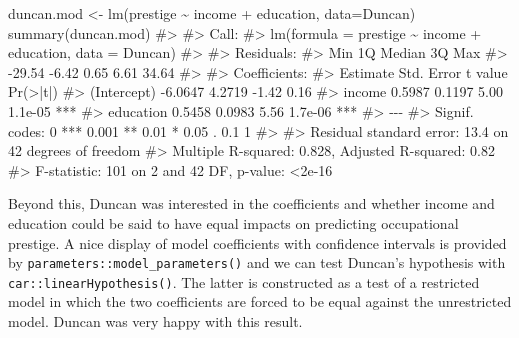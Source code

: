 \documentclass[
  letterpaper,
  10pt,
  krantz2]{krantz}
\makeatletter
\newenvironment{Shaded}{\begin{snugshade}}{\end{snugshade}}
\newcommand{\AttributeTok}[1]{\textcolor[rgb]{0.40,0.45,0.13}{#1}}
\newcommand{\CommentTok}[1]{\textcolor[rgb]{0.37,0.37,0.37}{#1}}
\newcommand{\FunctionTok}[1]{\textcolor[rgb]{0.28,0.35,0.67}{#1}}
\newcommand{\NormalTok}[1]{\textcolor[rgb]{0.00,0.23,0.31}{#1}}
\newcommand{\OtherTok}[1]{\textcolor[rgb]{0.00,0.23,0.31}{#1}}
\newcommand{\SpecialCharTok}[1]{\textcolor[rgb]{0.37,0.37,0.37}{#1}}
\newenvironment{kframe}{%
  \medskip{}
  \setlength{\fboxsep}{.8em}
  \def\at@end@of@kframe{}%
  \ifinner\ifhmode%
  \def\at@end@of@kframe{\end{minipage}}%
  \begin{minipage}{\columnwidth}%
  \fi\fi%
  \def\FrameCommand##1{\hskip\@totalleftmargin \hskip-\fboxsep
  \colorbox{shadecolor}{##1}\hskip-\fboxsep
      \hskip-\linewidth \hskip-\@totalleftmargin \hskip\columnwidth}%
  \MakeFramed {\advance\hsize-\width
    \@totalleftmargin\z@ \linewidth\hsize
    \@setminipage}}%
{\par\unskip\endMakeFramed%
  \at@end@of@kframe}
\renewenvironment{Shaded}{\begin{kframe}}{\end{kframe}}
\makeatother
\begin{document}
\begin{Shaded}
\begin{Highlighting}[]
\NormalTok{duncan.mod }\OtherTok{\textless{}{-}} \FunctionTok{lm}\NormalTok{(prestige }\SpecialCharTok{\textasciitilde{}}\NormalTok{ income }\SpecialCharTok{+}\NormalTok{ education, }\AttributeTok{data=}\NormalTok{Duncan)}
\FunctionTok{summary}\NormalTok{(duncan.mod)}
\CommentTok{\#\textgreater{} }
\CommentTok{\#\textgreater{} Call:}
\CommentTok{\#\textgreater{} lm(formula = prestige \textasciitilde{} income + education, data = Duncan)}
\CommentTok{\#\textgreater{} }
\CommentTok{\#\textgreater{} Residuals:}
\CommentTok{\#\textgreater{}    Min     1Q Median     3Q    Max }
\CommentTok{\#\textgreater{} {-}29.54  {-}6.42   0.65   6.61  34.64 }
\CommentTok{\#\textgreater{} }
\CommentTok{\#\textgreater{} Coefficients:}
\CommentTok{\#\textgreater{}             Estimate Std. Error t value Pr(\textgreater{}|t|)    }
\CommentTok{\#\textgreater{} (Intercept)  {-}6.0647     4.2719   {-}1.42     0.16    }
\CommentTok{\#\textgreater{} income        0.5987     0.1197    5.00  1.1e{-}05 ***}
\CommentTok{\#\textgreater{} education     0.5458     0.0983    5.56  1.7e{-}06 ***}
\CommentTok{\#\textgreater{} {-}{-}{-}}
\CommentTok{\#\textgreater{} Signif. codes:  0 \textquotesingle{}***\textquotesingle{} 0.001 \textquotesingle{}**\textquotesingle{} 0.01 \textquotesingle{}*\textquotesingle{} 0.05 \textquotesingle{}.\textquotesingle{} 0.1 \textquotesingle{} \textquotesingle{} 1}
\CommentTok{\#\textgreater{} }
\CommentTok{\#\textgreater{} Residual standard error: 13.4 on 42 degrees of freedom}
\CommentTok{\#\textgreater{} Multiple R{-}squared:  0.828,  Adjusted R{-}squared:  0.82 }
\CommentTok{\#\textgreater{} F{-}statistic:  101 on 2 and 42 DF,  p{-}value: \textless{}2e{-}16}
\end{Highlighting}
\end{Shaded}

Beyond this, Duncan was interested in the coefficients and whether
income and education could be said to have equal impacts on predicting
occupational prestige. A nice display of model coefficients with
confidence intervals is provided by
\texttt{parameters::model\_parameters()} and we can test Duncan's
hypothesis with \texttt{car::linearHypothesis()}. The latter is
constructed as a test of a restricted model in which the two
coefficients are forced to be equal against the unrestricted model.
Duncan was very happy with this result.
\end{document}
